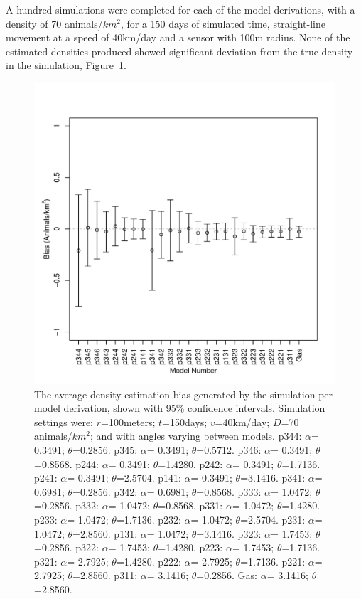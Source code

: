 \documentclass[a4paper,10pt,reqno,oneside]{amsart}
\begin{document}
A hundred simulations were completed for each of the model derivations, with a density of 70 animals/$km^2$, for a 150 days of simulated time, straight-line movement at a speed of 40km/day and a sensor with 100m radius. None of the estimated densities produced showed significant deviation from the true density in the simulation, Figure~\ref{f:ModelBias}.
\begin{figure}
\centering
\includegraphics[width=1\textwidth]{imgs/AverageModelBias.pdf}
\caption{The average density estimation bias generated by the simulation per model derivation, shown with 95\% confidence intervals. Simulation settings were: $r$=100meters; $t$=150days; $v$=40km/day; $D$=70 animals/$km^2$; and with angles varying between models.
 p344: $\alpha$= 0.3491; $\theta$=0.2856.  
 p345: $\alpha$= 0.3491; $\theta$=0.5712.
 p346: $\alpha$= 0.3491; $\theta$=0.8568.
 p244: $\alpha$= 0.3491; $\theta$=1.4280.
 p242: $\alpha$= 0.3491; $\theta$=1.7136.
 p241: $\alpha$= 0.3491; $\theta$=2.5704.
 p141: $\alpha$= 0.3491; $\theta$=3.1416.
 p341: $\alpha$= 0.6981; $\theta$=0.2856. 
 p342: $\alpha$= 0.6981; $\theta$=0.8568.
 p333: $\alpha$= 1.0472; $\theta$=0.2856.      
 p332: $\alpha$= 1.0472; $\theta$=0.8568.
 p331: $\alpha$= 1.0472; $\theta$=1.4280.
 p233: $\alpha$= 1.0472; $\theta$=1.7136.
 p232: $\alpha$= 1.0472; $\theta$=2.5704.
 p231: $\alpha$= 1.0472; $\theta$=2.8560.
 p131: $\alpha$= 1.0472; $\theta$=3.1416.
 p323: $\alpha$= 1.7453; $\theta$=0.2856.  
 p322: $\alpha$= 1.7453; $\theta$=1.4280.
 p223: $\alpha$= 1.7453; $\theta$=1.7136.       
 p321: $\alpha$= 2.7925; $\theta$=1.4280.         
 p222: $\alpha$= 2.7925; $\theta$=1.7136. 
 p221: $\alpha$= 2.7925; $\theta$=2.8560.       
 p311: $\alpha$= 3.1416; $\theta$=0.2856.  
 Gas: $\alpha$= 3.1416; $\theta$=2.8560.                                       
    }
\label{f:ModelBias}
\end{figure}
\end{document}
